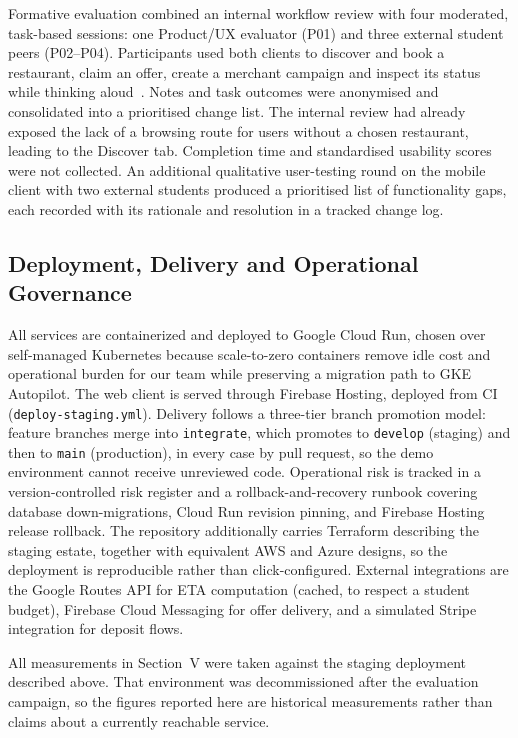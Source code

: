 \documentclass[conference]{IEEEtran}
\begin{document}
Formative evaluation combined an internal workflow review with four moderated, task-based sessions: one Product/UX evaluator (P01) and three external student peers (P02--P04). Participants used both clients to discover and book a restaurant, claim an offer, create a merchant campaign and inspect its status while thinking aloud~\cite{cooke2010assessing}. Notes and task outcomes were anonymised and consolidated into a prioritised change list. The internal review had already exposed the lack of a browsing route for users without a chosen restaurant, leading to the Discover tab. Completion time and standardised usability scores were not collected. An additional qualitative user-testing round on the mobile client with two external students produced a prioritised list of functionality gaps, each recorded with its rationale and resolution in a tracked change log.

\subsection{Deployment, Delivery and Operational Governance}

All services are containerized and deployed to Google Cloud Run, chosen over self-managed Kubernetes because scale-to-zero containers remove idle cost and operational burden for our team while preserving a migration path to GKE Autopilot. The web client is served through Firebase Hosting, deployed from CI (\texttt{deploy-staging.yml}). Delivery follows a three-tier branch promotion model: feature branches merge into \texttt{integrate}, which promotes to \texttt{develop} (staging) and then to \texttt{main} (production), in every case by pull request, so the demo environment cannot receive unreviewed code. Operational risk is tracked in a version-controlled risk register and a rollback-and-recovery runbook covering database down-migrations, Cloud Run revision pinning, and Firebase Hosting release rollback. The repository additionally carries Terraform describing the staging estate, together with equivalent AWS and Azure designs, so the deployment is reproducible rather than click-configured. External integrations are the Google Routes API for ETA computation (cached, to respect a student budget), Firebase Cloud Messaging for offer delivery, and a simulated Stripe integration for deposit flows.

All measurements in Section~V were taken against the staging deployment described above. That environment was decommissioned after the evaluation campaign, so the figures reported here are historical measurements rather than claims about a currently reachable service.
\end{document}
